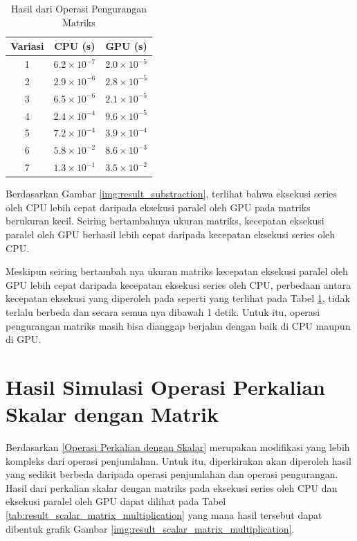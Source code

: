 \begin{table}[H]
	\centering
	\caption{Hasil dari Operasi Pengurangan Matriks}
	\label{tab:result_substraction}
	\begin{tabular}{ccc}
		\toprule
		Variasi & CPU (s)              & GPU (s)              \\
		\midrule
		1       & $6.2 \times 10^{-7}$ & $2.0 \times 10^{-5}$ \\
		2       & $2.9 \times 10^{-6}$ & $2.8 \times 10^{-5}$ \\
		3       & $6.5 \times 10^{-6}$ & $2.1 \times 10^{-5}$ \\
		4       & $2.4 \times 10^{-4}$ & $9.6 \times 10^{-5}$ \\
		5       & $7.2 \times 10^{-4}$ & $3.9 \times 10^{-4}$ \\
		6       & $5.8 \times 10^{-2}$ & $8.6 \times 10^{-3}$ \\
		7       & $1.3 \times 10^{-1}$ & $3.5 \times 10^{-2}$ \\
		\bottomrule
	\end{tabular}
\end{table}

Berdasarkan Gambar \ref{img:result_substraction}, terlihat bahwa eksekusi series oleh CPU lebih cepat daripada eksekusi paralel oleh GPU pada matriks berukuran kecil. Seiring bertambahnya ukuran matriks, kecepatan eksekusi paralel oleh GPU berhasil lebih cepat daripada kecepatan eksekusi series oleh CPU.

Meskipun seiring bertambah nya ukuran matriks kecepatan eksekusi paralel oleh GPU lebih cepat daripada kecepatan eksekusi series oleh CPU, perbedaan antara kecepatan eksekusi yang diperoleh pada seperti yang terlihat pada Tabel \ref{tab:result_substraction}, tidak terlalu berbeda dan secara semua nya dibawah 1 detik. Untuk itu, operasi pengurangan matriks masih bisa dianggap berjalan dengan baik di CPU maupun di GPU.

\section{Hasil Simulasi Operasi Perkalian Skalar dengan Matrik}

Berdasarkan \ref{Operasi Perkalian dengan Skalar} merupakan modifikasi yang lebih kompleks dari operasi penjumlahan. Untuk itu, diperkirakan akan diperoleh hasil yang sedikit berbeda daripada operasi penjumlahan dan operasi pengurangan. Hasil dari perkalian skalar dengan matriks pada eksekusi series oleh CPU dan eksekusi paralel oleh GPU dapat dilihat pada Tabel \ref{tab:result_scalar_matrix_multiplication} yang mana hasil tersebut dapat dibentuk grafik Gambar \ref{img:result_scalar_matrix_multiplication}.

